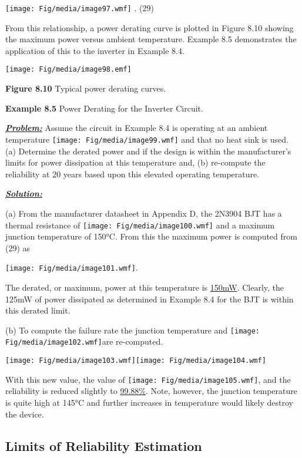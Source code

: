 \texttt{[image: Fig/media/image97.wmf]} . (29)

From this relationship, a power derating curve is plotted in Figure 8.10
showing the maximum power versus ambient temperature. Example 8.5
demonstrates the application of this to the inverter in Example 8.4.

\texttt{[image: Fig/media/image98.emf]}

\textbf{Figure 8.10} Typical power derating curves.

\textbf{Example 8.5} Power Derating for the Inverter Circuit.

\emph{\textbf{\ul{Problem:}}} Assume the circuit in Example 8.4 is
operating at an ambient temperature
\texttt{[image: Fig/media/image99.wmf]} and that no heat sink is used.
(a) Determine the derated power and if the design is within the
manufacturer's limits for power dissipation at this temperature and, (b)
re-compute the reliability at 20 years based upon this elevated
operating temperature.

\emph{\textbf{\ul{Solution:}}}

(a) From the manufacturer datasheet in Appendix D, the 2N3904 BJT has a
thermal resistance of \texttt{[image: Fig/media/image100.wmf]} and a
maximum junction temperature of 150°C. From this the maximum power is
computed from (29) as

\texttt{[image: Fig/media/image101.wmf]}.

The derated, or maximum, power at this temperature is \ul{150mW}.
Clearly, the 125mW of power dissipated as determined in Example 8.4 for
the BJT is within this derated limit.

(b) To compute the failure rate the junction temperature and
\texttt{[image: Fig/media/image102.wmf]}are re-computed.

\texttt{[image: Fig/media/image103.wmf]}\texttt{[image: Fig/media/image104.wmf]}

With this new value, the value of
\texttt{[image: Fig/media/image105.wmf]}, and the reliability is reduced
slightly to \ul{99.88\%}. Note, however, the junction temperature is
quite high at 145°C and further increases in temperature would likely
destroy the device.

\subsection{Limits of Reliability
Estimation}\label{limits-of-reliability-estimation}

